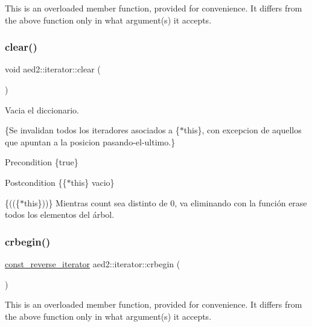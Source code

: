 This is an overloaded member function, provided for convenience. It differs from the above function only in what argument(s) it accepts. \mbox{\label{classaed2_1_1iterator_ac98b533e402839c99d33d3118906c38f}} 
\subsubsection{\texorpdfstring{clear()}{clear()}}
{\footnotesize\ttfamily void aed2\+::iterator\+::clear (\begin{DoxyParamCaption}{ }\end{DoxyParamCaption})\hspace{0.3cm}{\ttfamily [inline]}}



Vacia el diccionario. 

\{Se invalidan todos los iteradores asociados a \{$\ast$this\}, con excepcion de aquellos que apuntan a la posicion pasando-\/el-\/ultimo.\}

\begin{DoxyPrecond}{Precondition}
\{true\} 
\end{DoxyPrecond}
\begin{DoxyPostcond}{Postcondition}
\{\{$\ast$this\}  vacio\}
\end{DoxyPostcond}
\{((\{$\ast$this\}))\} Mientras count sea distinto de 0, va eliminando con la función erase todos los elementos del árbol. \mbox{\label{classaed2_1_1iterator_aa4b6ce667258581859351db42cfd3ee4}} 
\subsubsection{\texorpdfstring{crbegin()}{crbegin()}}
{\footnotesize\ttfamily \hyperlink{classaed2_1_1iterator_a657402896e5b5966660032f5686cc4c4}{const\+\_\+reverse\+\_\+iterator} aed2\+::iterator\+::crbegin (\begin{DoxyParamCaption}{ }\end{DoxyParamCaption})\hspace{0.3cm}{\ttfamily [inline]}}

This is an overloaded member function, provided for convenience. It differs from the above function only in what argument(s) it accepts. \mbox{\label{classaed2_1_1iterator_a2e31ad7ded06c666c6c37c5d30bb41af}} 

